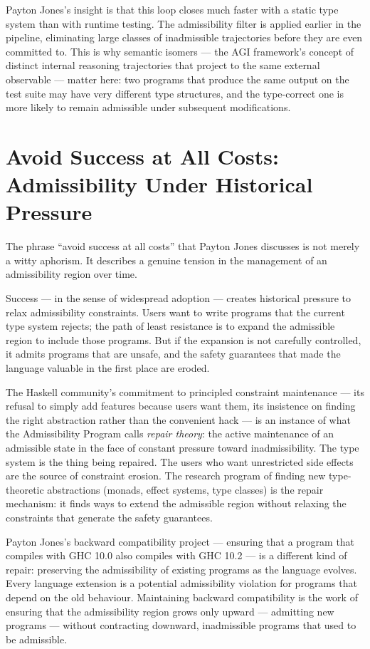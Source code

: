\documentclass[12pt]{article}
\begin{document}
Payton Jones's insight is that this loop closes much faster with a static type
system than with runtime testing. The admissibility filter is applied earlier in
the pipeline, eliminating large classes of inadmissible trajectories before they
are even committed to. This is why semantic isomers — the AGI framework's
concept of distinct internal reasoning trajectories that project to the same
external observable — matter here: two programs that produce the same output on
the test suite may have very different type structures, and the type-correct one
is more likely to remain admissible under subsequent modifications.

\section{Avoid Success at All Costs: Admissibility Under Historical Pressure}

The phrase ``avoid success at all costs'' that Payton Jones discusses is not
merely a witty aphorism. It describes a genuine tension in the management of an
admissibility region over time.

Success — in the sense of widespread adoption — creates historical pressure to
relax admissibility constraints. Users want to write programs that the current
type system rejects; the path of least resistance is to expand the admissible
region to include those programs. But if the expansion is not carefully
controlled, it admits programs that are unsafe, and the safety guarantees that
made the language valuable in the first place are eroded.

The Haskell community's commitment to principled constraint maintenance — its
refusal to simply add features because users want them, its insistence on finding
the right abstraction rather than the convenient hack — is an instance of what
the Admissibility Program calls \emph{repair theory}: the active maintenance of
an admissible state in the face of constant pressure toward inadmissibility. The
type system is the thing being repaired. The users who want unrestricted side
effects are the source of constraint erosion. The research program of finding
new type-theoretic abstractions (monads, effect systems, type classes) is the
repair mechanism: it finds ways to extend the admissible region without relaxing
the constraints that generate the safety guarantees.

Payton Jones's backward compatibility project — ensuring that a program that
compiles with GHC 10.0 also compiles with GHC 10.2 — is a different kind of
repair: preserving the admissibility of existing programs as the language
evolves. Every language extension is a potential admissibility violation for
programs that depend on the old behaviour. Maintaining backward compatibility is
the work of ensuring that the admissibility region grows only upward — admitting
new programs — without contracting downward, inadmissible programs that used to
be admissible.
\end{document}
